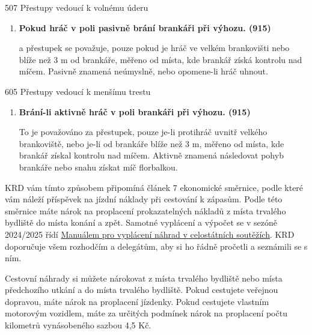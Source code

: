 \documentclass{newsletter}
\begin{document}
\begin{admonition-quote}{507 Přestupy vedoucí k volnému úderu}
	\begin{enumerate}\addtocounter{enumi}{9}
		\item \textbf{Pokud hráč v poli pasivně brání brankáři při výhozu. (915)}
		
		\begin{flushleft}
			a přestupek se považuje, pouze pokud je hráč ve velkém brankovišti nebo blíže než 3 m od brankáře, měřeno od
			místa, kde brankář získá kontrolu nad míčem. Pasivně znamená neúmyslně, nebo opomene-li hráč uhnout.
		\end{flushleft}
	\end{enumerate}
\end{admonition-quote}
\begin{admonition-quote}{605 Přestupy vedoucí k menšímu trestu}
	\begin{enumerate}\addtocounter{enumi}{10}
		\item \textbf{Brání-li aktivně hráč v poli brankáři při výhozu. (915)}
		
		\begin{flushleft}
			To je považováno za přestupek, pouze je-li protihráč uvnitř velkého brankoviště, nebo je-li od brankáře blíže než 3 m, měřeno od místa, kde brankář získal kontrolu nad míčem. Aktivně znamená následovat pohyb brankáře nebo snahu získat míč florbalkou.
		\end{flushleft}
	\end{enumerate}
\end{admonition-quote}

\pagebreak
{}
KRD vám tímto způsobem připomíná článek 7 ekonomické směrnice, podle které vám náleží příspěvek na jízdní náklady při cestování k zápasům. Podle této směrnice máte nárok na proplacení prokazatelných nákladů z místa trvalého bydliště do místa konání a zpět. Samotné vyplácení a výpočet se v sezóně 2024/2025 řídí \href{https://www.ceskyflorbal.cz/data/document/20240723/160919_d7d7_Manual-pro-vyplaceni-nahrad-v-CE-soutezich-2024-final.pdf}{Manuálem pro vyplácení náhrad v celostátních soutěžích}. KRD doporučuje všem rozhodčím a delegátům, aby si ho řádně pročetli a seznámili se s ním.

Cestovní náhrady si můžete nárokovat z místa trvalého bydliště nebo místa předchozího utkání a do místa trvalého bydliště. Pokud cestujete veřejnou dopravou, máte nárok na proplacení jízdenky. Pokud cestujete vlastním motorovým vozidlem, máte za určitých podmínek nárok na proplacení počtu kilometrů vynásobeného sazbou 4,5 Kč.
\end{document}
